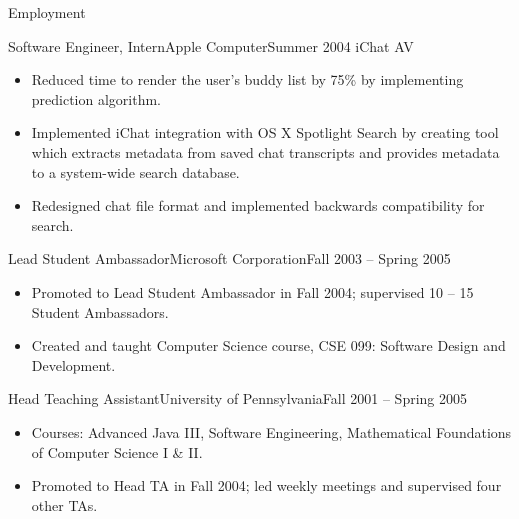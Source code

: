 \documentclass[]{mcdowellcv}
\begin{document}
\makeheader

\begin{cvsection}{Employment}
   \begin{cvsubsection}{Software Engineer, Intern}{Apple Computer}{Summer 2004}
      iChat AV
      \begin{itemize}
         \item Reduced time to render the user’s buddy list by 75\% by implementing prediction algorithm.
         \item Implemented iChat integration with OS X Spotlight Search by creating tool which extracts metadata from saved chat transcripts and provides metadata to a system-wide search database.
         \item Redesigned chat file format and implemented backwards compatibility for search.
      \end{itemize}
   \end{cvsubsection}

   \begin{cvsubsection}{Lead Student Ambassador}{Microsoft Corporation}{Fall 2003 -- Spring 2005}
      \begin{itemize}
         \item Promoted to Lead Student Ambassador in Fall 2004; supervised 10 -- 15 Student Ambassadors.
         \item Created and taught Computer Science course, CSE 099: Software Design and Development.
      \end{itemize}
   \end{cvsubsection}

   \begin{cvsubsection}{Head Teaching Assistant}{University of Pennsylvania}{Fall 2001 -- Spring 2005}
      \begin{itemize}
         \item Courses: Advanced Java III, Software Engineering, Mathematical Foundations of Computer Science I \& II.
         \item Promoted to Head TA in Fall 2004; led weekly meetings and supervised four other TAs.
      \end{itemize}
   \end{cvsubsection}


\end{cvsection}
\end{document}
